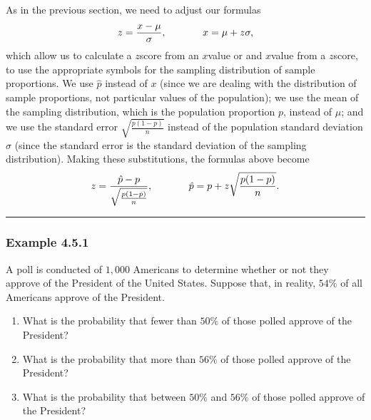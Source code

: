 \documentclass[letterpaper,10pt,english]{jupyterBook}
\begin{document}
\sphinxAtStartPar
As in the previous section, we need to adjust our formulas
\begin{equation*}
\begin{split} z = \frac{x - \mu}{\sigma}, \hspace{0.5in} x = \mu + z\sigma,\end{split}
\end{equation*}
\sphinxAtStartPar
which allow us to calculate a \(z\)\sphinxhyphen{}score from an \(x\)\sphinxhyphen{}value or and \(x\)\sphinxhyphen{}value from a \(z\)\sphinxhyphen{}score, to use the appropriate symbols for the sampling distribution of sample proportions. We use \(\hat{p}\) instead of \(x\) (since we are dealing with the distribution of sample proportions, not particular values of the population); we use the mean of the sampling distribution, which is the population proportion \(p\), instead of \(\mu\); and we use the standard error \(\sqrt{\frac{p(1-p)}{n}}\) instead of the population standard deviation \(\sigma\) (since the standard error is the standard deviation of the sampling distribution). Making these substitutions, the formulas above become
\begin{equation*}
\begin{split} z = \frac{\hat{p} - p}{\sqrt{\frac{p(1-p)}{n}}}, \hspace{0.5in} \hat{p} = p + z\sqrt{\frac{p(1-p)}{n}}. \end{split}
\end{equation*}

\bigskip\hrule\bigskip



\subsubsection{Example 4.5.1}
\label{\detokenize{Ch4 The Normal Distribution and the Central Limit Theorem/4.5 The Central Limit Theorem for Proportions:example-4-5-1}}
\sphinxAtStartPar
A poll is conducted of \(1{,}000\) Americans to determine whether or not they approve of the President of the United States. Suppose that, in reality, \(54\%\) of all Americans approve of the President.
\begin{enumerate}
%
\item {} 
\sphinxAtStartPar
What is the probability that fewer than \(50\%\) of those polled approve of the President?

\item {} 
\sphinxAtStartPar
What is the probability that more than \(56\%\) of those polled approve of the President?

\item {} 
\sphinxAtStartPar
What is the probability that between \(50\%\) and \(56\%\) of those polled approve of the President?

\end{enumerate}
\end{document}

